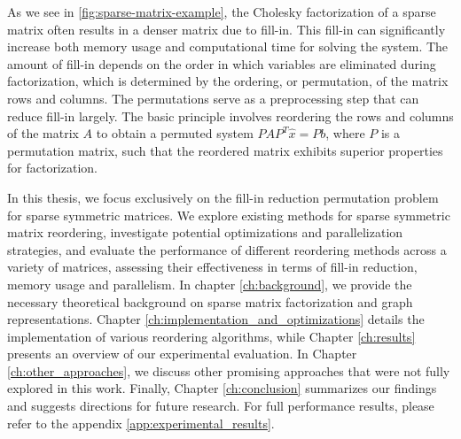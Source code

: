 As we see in \cref{fig:sparse-matrix-example}, the Cholesky factorization of a sparse matrix often results in a denser matrix due to fill-in. This fill-in can significantly increase both memory usage and computational time for solving the system. The amount of fill-in depends on the order in which variables are eliminated during factorization, which is determined by the ordering, or permutation, of the matrix rows and columns. The permutations serve as a preprocessing step that can reduce fill-in largely. The basic principle involves reordering the rows and columns of the matrix $A$ to obtain a permuted system $PAP^T \hat{x} = Pb$, where $P$ is a permutation matrix, such that the reordered matrix exhibits superior properties for factorization. 

In this thesis, we focus exclusively on the fill-in reduction permutation problem for sparse symmetric matrices. We explore existing methods for sparse symmetric matrix reordering, investigate potential optimizations and parallelization strategies, and evaluate the performance of different reordering methods across a variety of matrices, assessing their effectiveness in terms of fill-in reduction, memory usage and parallelism. In chapter \ref{ch:background}, we provide the necessary theoretical background on sparse matrix factorization and graph representations. Chapter \ref{ch:implementation_and_optimizations} details the implementation of various reordering algorithms, while Chapter \ref{ch:results} presents an overview of our experimental evaluation. In Chapter \ref{ch:other_approaches}, we discuss other promising approaches that were not fully explored in this work. Finally, Chapter \ref{ch:conclusion} summarizes our findings and suggests directions for future research. For full performance results, please refer to the appendix \ref{app:experimental_results}.




